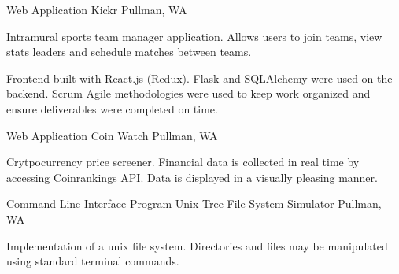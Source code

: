 \begin{cventries}
  \cventry
    {Web Application}
    {Kickr}
    {Pullman, WA}
    {}
    {
      \begin{cvitems}
        \item {Intramural sports team manager application. Allows users to join teams, view stats leaders and schedule matches between teams.}
        \item {Frontend built with React.js (Redux). Flask and SQLAlchemy were used on the backend. Scrum Agile methodologies were used to keep work organized and ensure deliverables were completed on time.}
      \end{cvitems}
    }
    \cventry
    {Web Application}
    {Coin Watch}
    {Pullman, WA}
    {}
    {
      \begin{cvitems}
        \item {Crytpocurrency price screener. Financial data is collected in real time by accessing Coinrankings API. Data is displayed in a visually pleasing manner.}
      \end{cvitems}
    }
    \cventry
    {Command Line Interface Program}
    {Unix Tree File System Simulator}
    {Pullman, WA}
    {}
    {
      \begin{cvitems}
        \item {Implementation of a unix file system. Directories and files may be manipulated using standard terminal commands.}
      \end{cvitems}
    }
\end{cventries}
